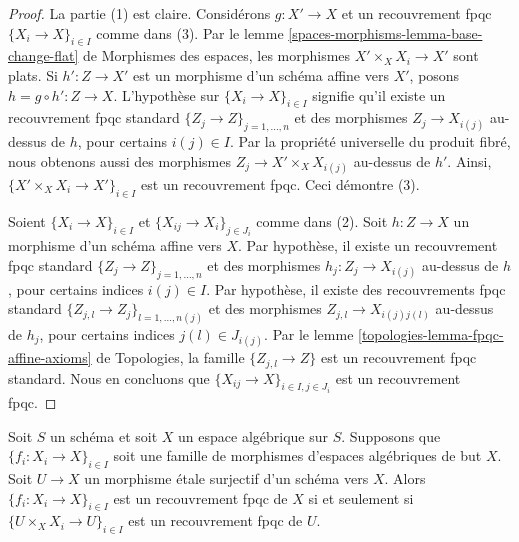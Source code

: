 \begin{proof}
La partie (1) est claire. Considérons $g : X' \to X$ et
un recouvrement fpqc $\{X_i \to X\}_{i\in I}$ comme dans (3). Par le
lemme \ref{spaces-morphisms-lemma-base-change-flat} de Morphismes des espaces,
les morphismes $X' \times_X X_i \to X'$
sont plats. Si $h' : Z \to X'$ est un morphisme d'un schéma affine
vers $X'$, posons $h = g \circ h' : Z \to X$. L'hypothèse
sur $\{X_i \to X\}_{i\in I}$ signifie qu'il existe un recouvrement fpqc standard
$\{Z_j \to Z\}_{j = 1, \ldots, n}$ et des morphismes $Z_j \to X_{i(j)}$ au-dessus de
$h$, pour certains $i(j) \in I$. Par la propriété universelle du produit fibré,
nous obtenons aussi des morphismes $Z_j \to X' \times_X X_{i(j)}$ au-dessus de $h'$.
Ainsi, $\{X' \times_X X_i \to X'\}_{i\in I}$ est un recouvrement fpqc.
Ceci démontre (3).

\medskip\noindent
Soient $\{X_i \to X\}_{i\in I}$ et $\{X_{ij} \to X_i\}_{j\in J_i}$ comme
dans (2). Soit $h : Z \to X$ un morphisme d'un schéma affine vers $X$.
Par hypothèse, il existe un recouvrement fpqc standard
$\{Z_j \to Z\}_{j = 1, \ldots, n}$ et des morphismes $h_j : Z_j \to X_{i(j)}$
au-dessus de $h$, pour certains indices $i(j) \in I$. Par hypothèse, il existe des
recouvrements fpqc standard
$\{Z_{j, l} \to Z_j\}_{l = 1, \ldots, n(j)}$
et des morphismes $Z_{j, l} \to X_{i(j)j(l)}$ au-dessus de
$h_j$, pour certains indices $j(l) \in J_{i(j)}$. Par le
lemme \ref{topologies-lemma-fpqc-affine-axioms} de Topologies,
la famille $\{Z_{j, l} \to Z\}$ est un recouvrement fpqc standard.
Nous en concluons que $\{X_{ij} \to X\}_{i \in I, j\in J_i}$
est un recouvrement fpqc.
\end{proof}

\begin{lemma}
\label{lemma-recognize-fpqc-covering}
Soit $S$ un schéma et soit $X$ un espace algébrique sur $S$.
Supposons que $\{f_i : X_i \to X\}_{i \in I}$ soit une famille de morphismes
d'espaces algébriques de but $X$. Soit $U \to X$ un morphisme
\'etale surjectif d'un schéma vers $X$. Alors
$\{f_i : X_i \to X\}_{i \in I}$ est un recouvrement fpqc de $X$ si et seulement
si $\{U \times_X X_i \to U\}_{i \in I}$ est un recouvrement fpqc de $U$.
\end{lemma}

